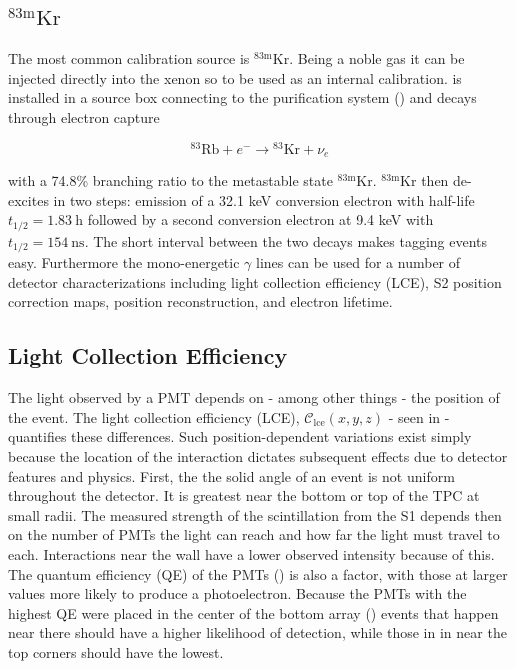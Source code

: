 \subsection{$\mathrm{^{83m}Kr}$}
\label{subsec:det_char_kr}
The most common calibration source is $\mathrm{^{83m}Kr}$.  Being a noble gas it can be injected directly into the xenon so to be used as an
internal calibration.   is installed in a source box connecting to the purification system
() and decays through electron capture

\begin{equation}
\mathrm{^{83}Rb} + e^- \rightarrow \mathrm{^{83}Kr} + \nu_e
\end{equation}

with a 74.8\% branching ratio to the metastable state $\mathrm{^{83m}Kr}$.  $\mathrm{^{83m}Kr}$ then de-excites in two steps: emission of a 32.1 keV
conversion electron with half-life $t_{1/2} = 1.83\ \mathrm{h}$ followed by a second conversion electron at 9.4 keV with
$t_{1/2} = 154\ \mathrm{ns}$.  The short
interval between the two decays makes tagging events easy.  Furthermore the mono-energetic $\gamma$ lines can be used for a number of
detector characterizations including light collection efficiency (LCE), S2 position correction maps, position reconstruction, and electron
lifetime.

\subsection{Light Collection Efficiency}
\label{subsec:det_char_lce}
The light observed by a PMT depends on - among other things - the position of the event.  The light collection efficiency (LCE),
$\mathcal{C}_{\mathrm{lce}}(x, y, z)$ - seen in  - quantifies these differences.  Such position-dependent variations
exist simply because the location of
the interaction dictates subsequent effects due to detector features and physics.  First, the the solid angle of an event is not uniform
throughout the detector.  It is greatest near the bottom or top of the TPC at small radii.  The measured strength of the scintillation
from the S1 depends then on the number of PMTs the light can reach and how far the light must travel to each.  Interactions near the
wall have a lower observed intensity because of this.  The quantum efficiency (QE) of the PMTs () is also a
factor, with those at larger values more likely to produce a photoelectron.  Because the PMTs with the highest QE were placed in the
center of the bottom array () events that happen near there should have a higher likelihood of detection,
while those in in near the top corners should have the lowest.


